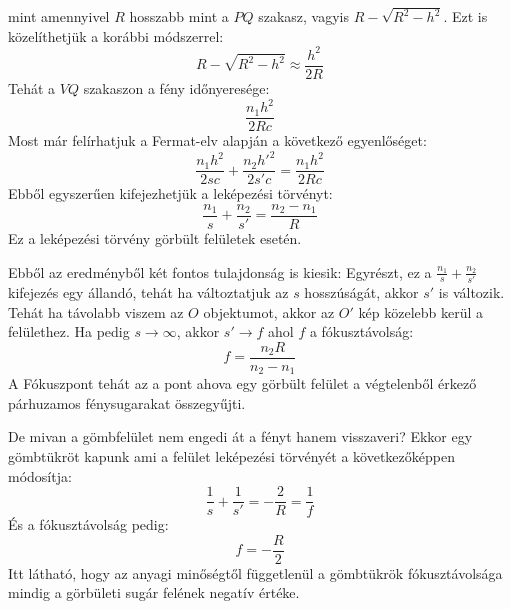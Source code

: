 \documentclass[a4paper,12pt]{article}
\begin{document}
mint amennyivel $R$ hosszabb mint a $PQ$ szakasz, vagyis $R - \sqrt{R^2 - h^2}$. Ezt is közelíthetjük a korábbi módszerrel:
\begin{equation}
    R - \sqrt{R^2 - h^2} \approx \frac{h^2}{2R}
\end{equation}
Tehát a $VQ$ szakaszon a fény időnyeresége:
\begin{equation}
    \frac{n_1 h^2}{2R c}
\end{equation}
Most már felírhatjuk a Fermat-elv alapján a következő egyenlőséget:
\begin{equation}
    \frac{n_1 h^2}{2s c} + \frac{n_2 h'^2}{2s' c} = \frac{n_1 h^2}{2R c}
\end{equation}
Ebből egyszerűen kifejezhetjük a leképezési törvényt:
\begin{equation}
    \boxed{\frac{n_1}{s} + \frac{n_2}{s'} = \frac{n_2 - n_1}{R}}
\end{equation}
Ez a leképezési törvény görbült felületek esetén. 

Ebből az eredményből két fontos tulajdonság is kiesik: Egyrészt, ez a $\frac{n_1}{s} + \frac{n_2}{s'}$ kifejezés egy állandó, tehát ha változtatjuk az $s$ hosszúságát, akkor $s'$ is változik.
Tehát ha távolabb viszem az $O$ objektumot, akkor az $O'$ kép közelebb kerül a felülethez. Ha pedig $s \to \infty$, akkor $s' \to f$ ahol $f$ a fókusztávolság:
\begin{equation}
    \boxed{f = \frac{n_2 R}{n_2 - n_1}}
\end{equation}
A Fókuszpont tehát az a pont ahova egy görbült felület a végtelenből érkező párhuzamos fénysugarakat összegyűjti.

De mivan a gömbfelület nem engedi át a fényt hanem visszaveri? Ekkor egy gömbtükröt kapunk ami a felület leképezési törvényét a következőképpen módosítja:
\begin{equation}
    \boxed{\frac{1}{s} + \frac{1}{s'} = - \frac{2}{R} = \frac{1}{f}}
\end{equation}
És a fókusztávolság pedig:
\begin{equation}
    \boxed{f = - \frac{R}{2}}
\end{equation}
Itt látható, hogy az anyagi minőségtől függetlenül a gömbtükrök fókusztávolsága mindig a görbületi sugár felének negatív értéke.
\end{document}
